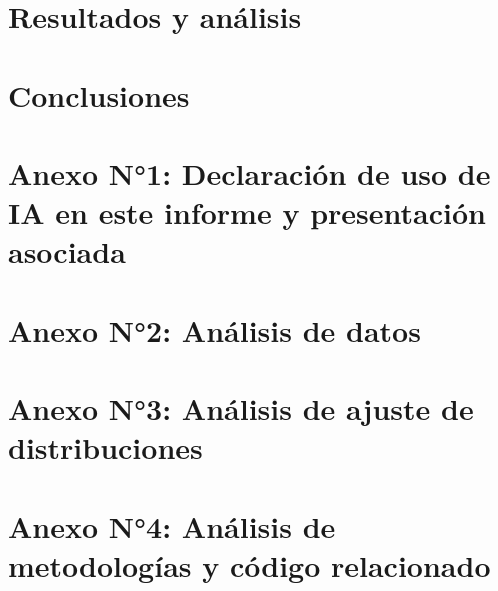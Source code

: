 \documentclass[pdftex,spanish]{pucthesis}	%
\begin{document}
\chapter{Resultados y análisis}


  \chapter{Conclusiones}



\cleardoublepage
{} \label{references}

\renewcommand{\bibname}{Referencias}






\cleardoublepage
{}\label{anexo:ia}
\chapter*{Anexo N°1: Declaración de uso de IA en este informe y presentación asociada}


\cleardoublepage
{}\label{anexo:datos}
\chapter*{Anexo N°2: Análisis de datos}


\cleardoublepage
{}\label{anexo:ajuste}
\chapter*{Anexo N°3: Análisis de ajuste de distribuciones}


\cleardoublepage
{}\label{anexo:metodologias}
\chapter*{Anexo N°4: Análisis de metodologías y código relacionado}


\cleardoublepage

\end{document}
